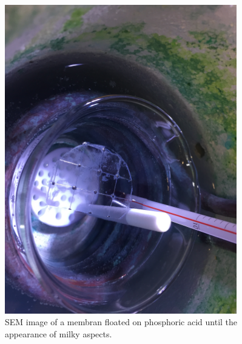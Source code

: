 \documentclass[../thesis.tex]{subfiles}
\begin{document}
        \begin{figure}[tb]
          \centering
          \includegraphics[width=0.9\textwidth]{images/milky_aspects.JPG}
          \caption{SEM image of a membran floated on phosphoric acid until the appearance of milky aspects.}
          \label{fig:milky-meb}
        \end{figure}
\end{document}
